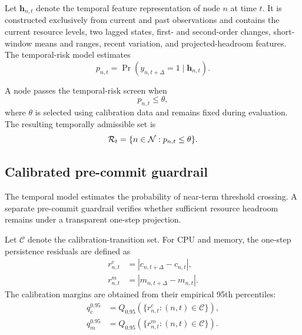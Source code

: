 Let $\mathbf{h}_{n,t}$ denote the temporal feature representation of
node $n$ at time $t$. It is constructed exclusively from current and
past observations and contains the current resource levels, two lagged
states, first- and second-order changes, short-window means and ranges,
recent variation, and projected-headroom features. The temporal-risk
model estimates
\begin{equation}
\label{eq:risk}
    p_{n,t}
    =
    \Pr
    \left(
        y_{n,t+\Delta}=1
        \mid
        \mathbf{h}_{n,t}
    \right).
\end{equation}

A node passes the temporal-risk screen when
\begin{equation}
\label{eq:risk-acceptance}
    p_{n,t}\leq\theta,
\end{equation}
where $\theta$ is selected using calibration data and remains fixed
during evaluation. The resulting temporally admissible set is
\begin{equation}
\label{eq:temporal-set}
    \mathcal{R}_t
    =
    \{n\in\mathcal{N}:p_{n,t}\leq\theta\}.
\end{equation}

\subsection{Calibrated pre-commit guardrail}

The temporal model estimates the probability of near-term threshold
crossing. A separate pre-commit guardrail verifies whether sufficient
resource headroom remains under a transparent one-step projection.

Let $\mathcal{C}$ denote the calibration-transition set. For CPU and
memory, the one-step persistence residuals are defined as
\begin{align}
\label{eq:cpu-residual}
    r^{c}_{n,t}
    &=
    \left|
        c_{n,t+\Delta}-c_{n,t}
    \right|,\\
\label{eq:memory-residual}
    r^{m}_{n,t}
    &=
    \left|
        m_{n,t+\Delta}-m_{n,t}
    \right|.
\end{align}
The calibration margins are obtained from their empirical
95th percentiles:
\begin{align}
\label{eq:q95-cpu}
    q_c^{0.95}
    &=
    Q_{0.95}
    \left(
        \{r^c_{n,t}:(n,t)\in\mathcal{C}\}
    \right),\\
\label{eq:q95-memory}
    q_m^{0.95}
    &=
    Q_{0.95}
    \left(
        \{r^m_{n,t}:(n,t)\in\mathcal{C}\}
    \right).
\end{align}

